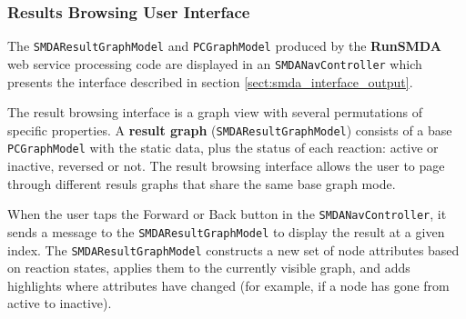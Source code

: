 \subsubsection{Results Browsing User Interface}
\label{sect:smda_results_browsing}

The \texttt{SMDAResultGraphModel} and \texttt{PCGraphModel} produced by the
\textbf{RunSMDA} web service processing code are displayed in an
\texttt{SMDANavController} which presents the interface described in section
\ref{sect:smda_interface_output}.

The result browsing interface is a graph view with several permutations of
specific properties. A \textbf{result graph} (\texttt{SMDAResultGraphModel})
consists of a base \texttt{PCGraphModel} with the static data, plus the status
of each reaction: active or inactive, reversed or not. The result browsing
interface allows the user to page through different resuls graphs that share the
same base graph mode.

When the user taps the Forward or Back button in the \texttt{SMDANavController},
it sends a message to the \texttt{SMDAResultGraphModel} to display the result at
a given index. The \texttt{SMDAResultGraphModel} constructs a new set of node
attributes based on reaction states, applies them to the currently visible
graph, and adds highlights where attributes have changed (for example, if a node
has gone from active to inactive).
